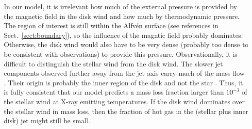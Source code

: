 In our model, it is irrelevant how much of the external pressure is provided by the magnetic field in the disk wind and how much by thermodynamic pressure. The region of interest is still within the Alfv\'en surface (see references in Sect.~\ref{sect:boundary}), so the influence of the magntic field probably dominates. Otherwise, the disk wind would also have to be very dense (probably too dense to be consistent with observations) to provide this pressure. Observationally, it is difficult to distinguish the stellar wind from the disk wind. The slower jet components observed further away from the jet axis carry much of the mass flow \citep{2000ApJ...537L..49B}. Their origin is probably the inner region of the disk and not the star \citep{2003ApJ...590L.107A}. Thus, it is fully consistent that our model predicts a mass loss fraction larger than  $10^{-3}$ of the stellar wind at X-ray emitting temperatures. If the disk wind dominates over the stellar wind in mass loss, then the fraction of hot gas in the (stellar plus inner disk) jet might still be small.